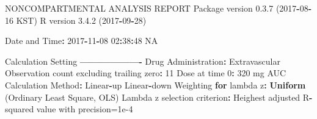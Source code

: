 \documentclass[12pt,]{krantz}
\newenvironment{Shaded}{\begin{snugshade}}{\end{snugshade}}
\newcommand{\KeywordTok}[1]{\textcolor[rgb]{0.13,0.29,0.53}{\textbf{#1}}}
\newcommand{\DecValTok}[1]{\textcolor[rgb]{0.00,0.00,0.81}{#1}}
\newcommand{\FloatTok}[1]{\textcolor[rgb]{0.00,0.00,0.81}{#1}}
\newcommand{\StringTok}[1]{\textcolor[rgb]{0.31,0.60,0.02}{#1}}
\newcommand{\OtherTok}[1]{\textcolor[rgb]{0.56,0.35,0.01}{#1}}
\newcommand{\ControlFlowTok}[1]{\textcolor[rgb]{0.13,0.29,0.53}{\textbf{#1}}}
\newcommand{\OperatorTok}[1]{\textcolor[rgb]{0.81,0.36,0.00}{\textbf{#1}}}
\newcommand{\NormalTok}[1]{#1}
\theoremstyle{definition}
\theoremstyle{definition}
\theoremstyle{definition}
\theoremstyle{remark}
\begin{document}
\begin{Shaded}
\begin{Highlighting}[]
\NormalTok{                        NONCOMPARTMENTAL ANALYSIS REPORT}
\NormalTok{                       Package version }\FloatTok{0.3}\NormalTok{.}\DecValTok{7}\NormalTok{ (}\DecValTok{2017}\OperatorTok{-}\DecValTok{08}\OperatorTok{-}\DecValTok{16}\NormalTok{ KST)}
\NormalTok{                          R version }\FloatTok{3.4}\NormalTok{.}\DecValTok{2}\NormalTok{ (}\DecValTok{2017}\OperatorTok{-}\DecValTok{09}\OperatorTok{-}\DecValTok{28}\NormalTok{)}

\NormalTok{Date and Time}\OperatorTok{:}\StringTok{ }\DecValTok{2017}\OperatorTok{-}\DecValTok{11}\OperatorTok{-}\DecValTok{08} \DecValTok{02}\OperatorTok{:}\DecValTok{38}\OperatorTok{:}\DecValTok{48} \OtherTok{NA}

\NormalTok{Calculation Setting}
\OperatorTok{-------------------}
\NormalTok{Drug Administration}\OperatorTok{:}\StringTok{ }\NormalTok{Extravascular}
\NormalTok{Observation count excluding trailing zero}\OperatorTok{:}\StringTok{ }\DecValTok{11}
\NormalTok{Dose at time }\DecValTok{0}\OperatorTok{:}\StringTok{ }\DecValTok{320}\NormalTok{ mg}
\NormalTok{AUC Calculation Method}\OperatorTok{:}\StringTok{ }\NormalTok{Linear}\OperatorTok{-}\NormalTok{up Linear}\OperatorTok{-}\NormalTok{down}
\NormalTok{Weighting }\ControlFlowTok{for}\NormalTok{ lambda z}\OperatorTok{:}\StringTok{ }\KeywordTok{Uniform}\NormalTok{ (Ordinary Least Square, OLS)}
\NormalTok{Lambda z selection criterion}\OperatorTok{:}\StringTok{ }\NormalTok{Heighest adjusted R}\OperatorTok{-}\NormalTok{squared value with precision=}\FloatTok{1e-4}



\end{Highlighting}
\end{Shaded}
\end{document}
